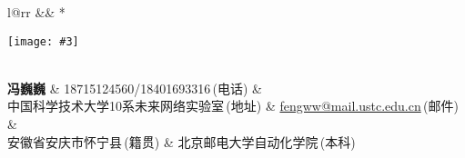 \newcommand{\paint}[3]{
    \begin{minipage}{#1}
        \texttt{[image: \#3]}
    \end{minipage} 
}
\newcommand{\myheader}{
\begin{tabular*}{\textwidth}{l@{\extracolsep{\fill}}rr}
  && \multirow{4}*{\paint{2.5cm}{3.5cm}{./image.jpg}}\\
  \specialrule{0em}{4pt}{4pt}
  \textbf{{\LARGE 冯巍巍}} & 18715124560/18401693316$\,${\color{labelgrey}(电话)} &\\
  中国科学技术大学10系未来网络实验室$\,${\color{labelgrey}(地址)} & \href{mailto:fengww@mail.ustc.edu.cn}{fengww@mail.ustc.edu.cn}$\,${\color{labelgrey}(邮件)} & \\
   安徽省安庆市怀宁县$\,${\color{labelgrey}(籍贯)} &  北京邮电大学自动化学院$\,${\color{labelgrey}(本科)} 
  \end{tabular*}\\\vspace{0.1in}
}

\myheader

